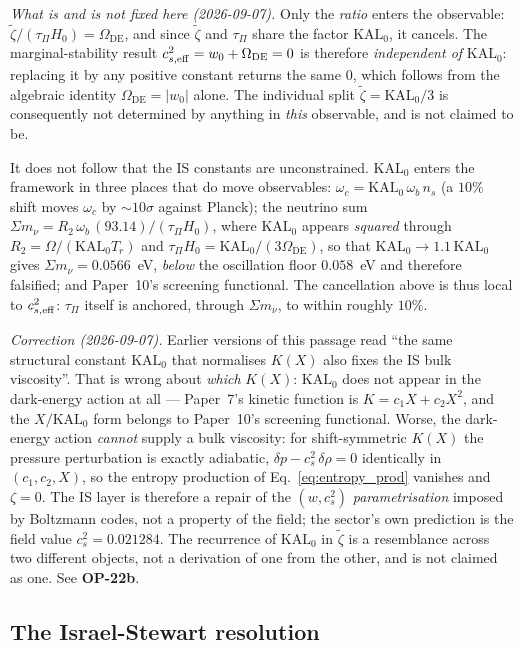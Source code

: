 \documentclass[12pt,a4paper]{article}
\newcommand{\KALz}{\mathrm{KAL}_0}
\newcommand{\wz}{w_0}
\newcommand{\OmDE}{\Omega_{\mathrm{DE}}}
\newcommand{\tauPi}{\tau_\Pi}
\newcommand{\ztilde}{\tilde{\zeta}}
\begin{document}
\emph{What is and is not fixed here (2026-09-07).} Only the \emph{ratio}
enters the observable: $\ztilde/(\tauPi H_0) = \OmDE$, and since $\ztilde$ and
$\tauPi$ share the factor $\KALz$, it cancels. The marginal-stability result
$c^2_{s,\rm eff} = \wz + \OmDE = 0$ is therefore \emph{independent of}
$\KALz$: replacing it by any positive constant returns the same $0$, which
follows from the algebraic identity $\OmDE = |\wz|$ alone. The individual split
$\ztilde = \KALz/3$ is consequently not determined by anything in \emph{this}
observable, and is not claimed to be.

It does not follow that the IS constants are unconstrained. $\KALz$ enters the
framework in three places that do move observables: $\omega_c =
\KALz\,\omega_b\,n_s$ (a $10\%$ shift moves $\omega_c$ by $\sim\!10\sigma$
against Planck); the neutrino sum $\Sigma m_\nu = R_2\,\omega_b\,(93.14)/(\tauPi
H_0)$, where $\KALz$ appears \emph{squared} through $R_2 = \Omega/(\KALz T_r)$
and $\tauPi H_0 = \KALz/(3\OmDE)$, so that $\KALz \to 1.1\,\KALz$ gives
$\Sigma m_\nu = 0.0566$~eV, \emph{below} the oscillation floor $0.058$~eV and
therefore falsified; and Paper~10's screening functional. The cancellation
above is thus local to $c^2_{s,\rm eff}$: $\tauPi$ itself is anchored, through
$\Sigma m_\nu$, to within roughly $10\%$.

\emph{Correction (2026-09-07).} Earlier versions of this passage read
``the same structural constant $\KALz$ that normalises $K(X)$ also fixes the IS
bulk viscosity''. That is wrong about \emph{which} $K(X)$: $\KALz$ does not
appear in the dark-energy action at all --- Paper~7's kinetic function is
$K = c_1X + c_2X^2$, and the $X/\KALz$ form belongs to Paper~10's screening
functional. Worse, the dark-energy action \emph{cannot} supply a bulk
viscosity: for shift-symmetric $K(X)$ the pressure perturbation is exactly
adiabatic, $\delta p - c^2_s\,\delta\rho = 0$ identically in $(c_1,c_2,X)$, so
the entropy production of Eq.~\eqref{eq:entropy_prod} vanishes and $\zeta = 0$.
The IS layer is therefore a repair of the $(w,c^2_s)$ \emph{parametrisation}
imposed by Boltzmann codes, not a property of the field; the sector's own
prediction is the field value $c^2_s = 0.021284$. The recurrence of $\KALz$ in
$\ztilde$ is a resemblance across two different objects, not a derivation of one
from the other, and is not claimed as one. See \textbf{OP-22b}.

\subsection{The Israel-Stewart resolution}
\label{subsec:IS_intro}
\end{document}
